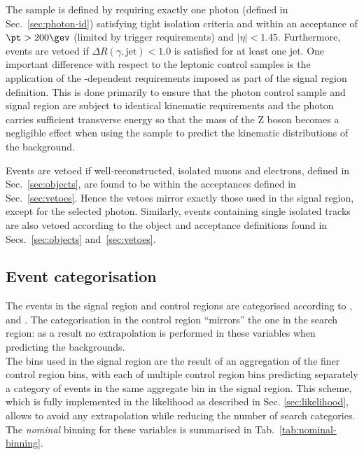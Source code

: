 The \gj sample is defined by requiring exactly one photon (defined in Sec.~\ref{sec:photon-id}) satisfying
tight isolation criteria and within an acceptance of $\pt > 200\gev$
(limited by trigger requirements) and $|\eta| < 1.45$. Furthermore,
events are vetoed if $\Delta R(\gamma,\textrm{jet}) < 1.0$ is
satisfied for at least one jet. One important difference with
respect to the leptonic control samples is the application of the
\HT-dependent \alphat requirements imposed as part of the signal
region definition. This is done primarily to ensure that the photon
control sample and signal region are subject to identical kinematic
requirements and the photon carries sufficient transverse energy so
that the mass of the Z boson becomes a negligible effect when using
the \gj sample to predict the kinematic distributions of the \znunu
background. 

Events are vetoed if well-reconstructed, isolated muons and electrons,
defined in Sec.~\ref{sec:objects}, are found to be within the
acceptances defined in Sec.~\ref{sec:vetoes}. Hence the vetoes mirror
exactly those used in the signal region, except for the selected
photon. Similarly, events containing single isolated tracks are also
vetoed according to the object and acceptance definitions found in
Secs.~\ref{sec:objects} and~\ref{sec:vetoes}. 

\subsection{Event categorisation}
\label{sec:event-categorisation}

The events in the signal region and control regions are categorised according to 
\njet, \nb and \scalht. 
The categorisation in the control region ``mirrors'' the one in the search region: 
as a result no extrapolation is performed in these variables when predicting the backgrounds. \\
The bins used in the signal region are the result of an aggregation of the finer control region bins, 
with each of multiple control region bins predicting separately a category of events in the same aggregate bin in the signal region. 
This scheme, which is fully implemented in the likelihood as described in Sec. \ref{sec:likelihood}, allows 
to avoid any extrapolation while reducing the number of search categories. \\
The \textit{nominal} binning for these variables is summarised in Tab.~\ref{tab:nominal-binning}. 

